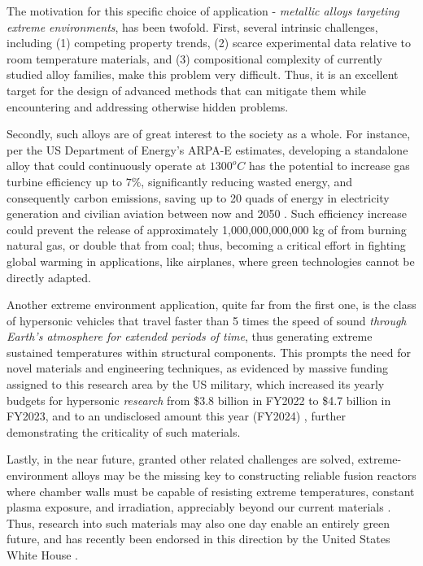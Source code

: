 The motivation for this specific choice of application - \emph{metallic alloys targeting extreme environments}, has been twofold. First, several intrinsic challenges, including (1) competing property trends, (2) scarce experimental data relative to room temperature materials, and (3) compositional complexity of currently studied alloy families, make this problem very difficult. Thus, it is an excellent target for the design of advanced methods that can mitigate them while encountering and addressing otherwise hidden problems.

Secondly, such alloys are of great interest to the society as a whole. For instance, per the US Department of Energy's ARPA-E estimates, developing a standalone alloy that could continuously operate at $1300^oC$ has the potential to increase gas turbine efficiency up to $7\%$, significantly reducing wasted energy, and consequently carbon emissions, saving up to 20 quads of energy in electricity generation and civilian aviation between now and 2050 \cite{ULTIMATEArpa-e.energy.gov}. Such efficiency increase could prevent the release of approximately 1,000,000,000,000 kg of  from burning natural gas, or double that from coal; thus, becoming a critical effort in fighting global warming in applications, like airplanes, where green technologies cannot be directly adapted. 

Another extreme environment application, quite far from the first one, is the class of hypersonic vehicles that travel faster than 5 times the speed of sound \emph{through Earth's atmosphere for extended periods of time}, thus generating extreme sustained temperatures within structural components. This prompts the need for novel materials and engineering techniques, as evidenced by massive funding assigned to this research area by the US military, which increased its yearly budgets for hypersonic \emph{research} from \$3.8 billion in FY2022 to \$4.7 billion in FY2023, and to an undisclosed amount this year (FY2024) \cite{Sayler2024HypersonicCongress}, further demonstrating the criticality of such materials.

Lastly, in the near future, granted other related challenges are solved, extreme-environment alloys may be the missing key to constructing reliable fusion reactors where chamber walls must be capable of resisting extreme temperatures, constant plasma exposure, and irradiation, appreciably beyond our current materials \cite{CHADWICKArpa-e.energy.gov}. Thus, research into such materials may also one day enable an entirely green future, and has recently been endorsed in this direction by the United States White House \cite{FactHouse}.

